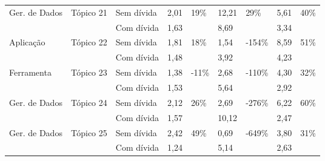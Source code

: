 \begin{longtable}{|l|l|l|l|l|l|l|l|l|}
\multirow{2}{*}{Ger. de Dados} & \multirow{2}{*}{Tópico 21} & Sem dívida              & 2,01            & \multirow{2}{*}{19\%}   & 12,21           & \multirow{2}{*}{29\%}    & 5,61            & \multirow{2}{*}{40\%}   \\ \cline{3-4} \cline{6-6} \cline{8-8}
                               &                            & Com dívida           & 1,63            &                         & 8,69            &                          & 3,34            &                         \\ \hline
\multirow{2}{*}{Aplicação}     & \multirow{2}{*}{Tópico 22} & Sem dívida              & 1,81            & \multirow{2}{*}{18\%}   & 1,54            & \multirow{2}{*}{-154\%}  & 8,59            & \multirow{2}{*}{51\%}   \\ \cline{3-4} \cline{6-6} \cline{8-8}
                               &                            & Com dívida           & 1,48            &                         & 3,92            &                          & 4,23            &                         \\ \hline
\multirow{2}{*}{Ferramenta}    & \multirow{2}{*}{Tópico 23} & Sem dívida              & 1,38            & \multirow{2}{*}{-11\%}  & 2,68            & \multirow{2}{*}{-110\%}  & 4,30            & \multirow{2}{*}{32\%}   \\ \cline{3-4} \cline{6-6} \cline{8-8}
                               &                            & Com dívida           & 1,53            &                         & 5,64            &                          & 2,92            &                         \\ \hline
\multirow{2}{*}{Ger. de Dados} & \multirow{2}{*}{Tópico 24} & Sem dívida              & 2,12            & \multirow{2}{*}{26\%}   & 2,69            & \multirow{2}{*}{-276\%}  & 6,22            & \multirow{2}{*}{60\%}   \\ \cline{3-4} \cline{6-6} \cline{8-8}
                               &                            & Com dívida           & 1,57            &                         & 10,12           &                          & 2,47            &                         \\ \hline
\multirow{2}{*}{Ger. de Dados} & \multirow{2}{*}{Tópico 25} & Sem dívida              & 2,42            & \multirow{2}{*}{49\%}   & 0,69            & \multirow{2}{*}{-649\%}  & 3,80            & \multirow{2}{*}{31\%}   \\ \cline{3-4} \cline{6-6} \cline{8-8}
                               &                            & Com dívida           & 1,24            &                         & 5,14            &                          & 2,63            &                         \\ \hline

\end{longtable}
